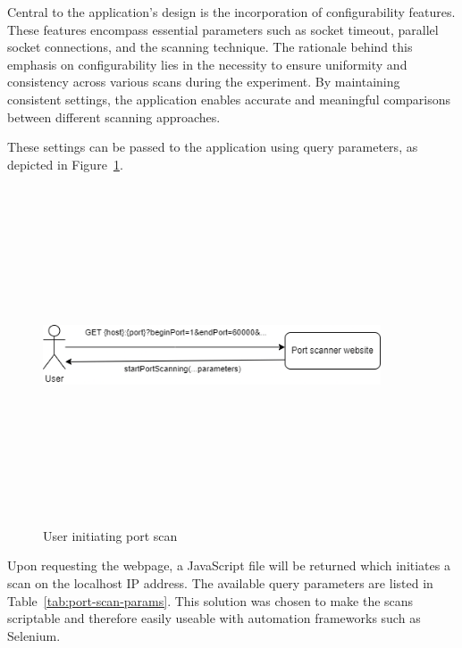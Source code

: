 Central to the application's design is the incorporation of configurability features. These features encompass essential parameters such as socket timeout, parallel socket connections, and the scanning technique. The rationale behind this emphasis on configurability lies in the necessity to ensure uniformity and consistency across various scans during the experiment. By maintaining consistent settings, the application enables accurate and meaningful comparisons between different scanning approaches.

These settings can be passed to the application using query parameters, as depicted in Figure~\ref{fig:initiate-scan}. 

\begin{figure}[ht]
    \centering
\includegraphics[width=10cm, height=10cm, keepaspectratio]{port_scanning_techniques/img/initiate_port_scan.png}
    \caption{User initiating port scan}
    \label{fig:initiate-scan}
\end{figure}

Upon requesting the webpage, a JavaScript file will be returned which initiates a scan on the localhost IP address. The available query parameters are listed in Table~\ref{tab:port-scan-params}. This solution was chosen to make the scans scriptable and therefore easily useable with automation frameworks such as Selenium.

